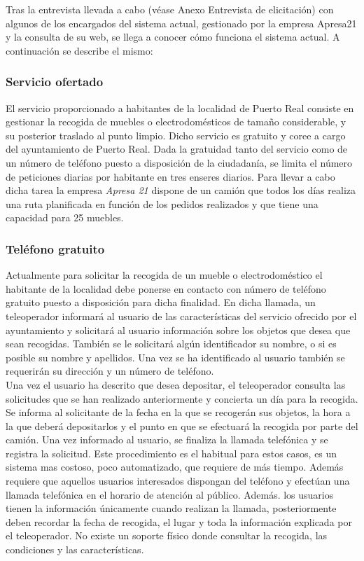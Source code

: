 Tras la entrevista llevada a cabo (véase Anexo Entrevista de elicitación) con algunos de los encargados del sistema actual, gestionado por la empresa Apresa21\cite{apresa21:web} y la consulta de su web, se llega a conocer cómo funciona el sistema actual. A continuación se describe el mismo:

\subsubsection*{Servicio ofertado}
El servicio proporcionado a habitantes de la localidad de Puerto Real consiste en gestionar la recogida de muebles o electrodomésticos de tamaño considerable, y su posterior traslado al punto limpio. Dicho servicio es gratuito y coree a cargo del ayuntamiento de Puerto Real. Dada la gratuidad tanto del servicio como de un número de teléfono puesto a disposición de la ciudadanía, se limita el número de peticiones diarias por habitante en tres enseres diarios. Para llevar a cabo dicha tarea la empresa \textit{Apresa 21} dispone de un camión que todos los días realiza una ruta planificada en función de los pedidos realizados y que tiene una capacidad para 25 muebles. \\

\subsubsection*{Teléfono gratuito}
Actualmente para solicitar la recogida de un mueble o electrodoméstico el habitante de la localidad debe ponerse en contacto con número de teléfono gratuito puesto a disposición para dicha finalidad. En dicha llamada, un teleoperador informará al usuario de las características del servicio ofrecido por el ayuntamiento y solicitará al usuario información sobre los objetos que desea que sean recogidas. También se le solicitará algún identificador su nombre, o si es posible su nombre y apellidos. Una vez se ha identificado al usuario también se requerirán su dirección y un número de teléfono. \\

Una vez el usuario ha descrito que desea depositar, el teleoperador consulta las solicitudes que se han realizado anteriormente y concierta un día para la recogida. Se informa al solicitante de la fecha en la que se recogerán sus objetos, la hora a la que deberá depositarlos y el punto en que se efectuará la recogida por parte del camión. Una vez informado al usuario, se finaliza la llamada telefónica y se registra la solicitud. Este procedimiento es el habitual para estos casos, es un sistema mas costoso, poco automatizado, que requiere de más tiempo. Además requiere que aquellos usuarios interesados dispongan del teléfono y efectúan una llamada telefónica en el horario de atención al público. Además. los usuarios tienen la información únicamente cuando realizan la llamada, posteriormente deben recordar la fecha de recogida, el lugar y toda la información explicada por el teleoperador. No existe un soporte físico donde consultar la recogida, las condiciones y las características. \\

